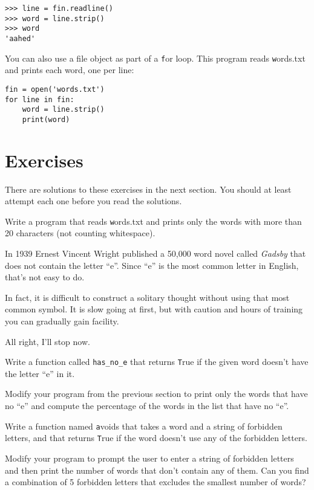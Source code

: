\documentclass[
DIV=11,
fontsize=12,
twoside,
headinclude=false,
titlepage=firstiscover,
abstract=true,
headsepline=true,
footsepline=true,
chapterprefix=true, %
headings=big,
bibliography=totoc,%
captions=tableheading
]{scrbook}
\theoremstyle{definition}
\begin{document}
\begin{lstlisting}
>>> line = fin.readline()
>>> word = line.strip()
>>> word
'aahed'
\end{lstlisting}
%
You can also use a file object as part of a {\texttt for} loop.
This program reads {\texttt words.txt} and prints each word, one
per line:

\begin{lstlisting}
fin = open('words.txt')
for line in fin:
    word = line.strip()
    print(word)
\end{lstlisting}
%

\section{Exercises}

There are solutions to these exercises in the next section.
You should at least attempt each one before you read the solutions.

\begin{exercise}
\normalfont
Write a program that reads {\texttt words.txt} and prints only the
words with more than 20 characters (not counting whitespace).

\end{exercise}

\begin{exercise}
\normalfont

In 1939 Ernest Vincent Wright published a 50,000 word novel called
{\em Gadsby} that does not contain the letter ``e''.  Since ``e'' is
the most common letter in English, that's not easy to do.

In fact, it is difficult to construct a solitary thought without using
that most common symbol.  It is slow going at first, but with caution
and hours of training you can gradually gain facility.

All right, I'll stop now.

Write a function called \verb"has_no_e" that returns {\texttt True} if
the given word doesn't have the letter ``e'' in it.

Modify your program from the previous section to print only the words
that have no ``e'' and compute the percentage of the words in the list
that have no ``e''.

\end{exercise}


\begin{exercise}
\normalfont 

Write a function named {\texttt avoids}
that takes a word and a string of forbidden letters, and
that returns {\texttt True} if the word doesn't use any of the forbidden
letters.

Modify your program to prompt the user to enter a string
of forbidden letters and then print the number of words that
don't contain any of them.
Can you find a combination of 5 forbidden letters that
excludes the smallest number of words?

\end{exercise}
\end{document}
